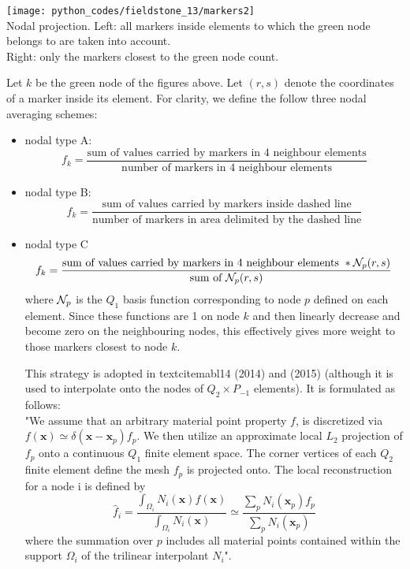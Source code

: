 \begin{center}
\texttt{[image: python\_codes/fieldstone\_13/markers2]}\\
{\captionfont Nodal projection. 
Left: all markers inside elements to which the green node belongs to are taken into account.\\
Right: only the markers closest to the green node count.}
\end{center}

Let $k$ be the green node of the figures above. Let $(r,s)$ 
denote the coordinates of a marker inside its element.
For clarity, we define the follow three nodal averaging schemes:
\begin{itemize}
\item nodal type A: 
\[
f_k = \frac{\text{sum of values carried by markers in 4 neighbour elements}}
{\text{number of markers in 4 neighbour elements}}
\]
\item nodal type B: 
\[
f_k = \frac{\text{sum of values carried by markers inside dashed line}}
{\text{number of markers in area delimited by the dashed line}}
\]
\item nodal type C 
\[
f_k = \frac{\text{sum of values carried by markers in 4 neighbour elements } * {\mathcal{N}}_p(r,s)}
{\text{sum of }{\mathcal{N}}_p(r,s)} 
\]
where ${\mathcal{N}}_p$ is the $Q_1$ basis function corresponding to node $p$ 
defined on each element. Since these 
functions are 1 on node $k$ and then linearly decrease and become zero on 
the neighbouring nodes, this
effectively gives more weight to those markers closest to node $k$.

This strategy is adopted in textcite{mabl14} (2014) and \textcite{mabl15} (2015) 
(although it is used to interpolate onto the nodes of $Q_2 \times P_{-1}$ elements). 
It is formulated as follows:\\
"We assume that an arbitrary material point property $f$, is discretized via 
$f(\bm x)\simeq \delta(\bm x - \bm x_p) f_p$. We then utilize an approximate local $L_2$ projection
of $f_p$ onto a continuous $Q_1$ finite element space. The corner vertices of
each $Q_2$ finite element define the mesh $f_p$ is projected onto.
The local reconstruction for a node i is defined by
\[
\hat{f}_i = \frac{\int_{\Omega_i}N_i(\bm x) f(\bm x)}{\int_{\Omega_i} N_i(\bm x)} \simeq
\frac{\sum_p N_i(\bm x_p) f_p }{\sum_p N_i(\bm x_p)}
\]
where the summation over $p$ includes all material points 
contained within the support $\Omega_i$ of the trilinear interpolant $N_i$".
\end{itemize}

